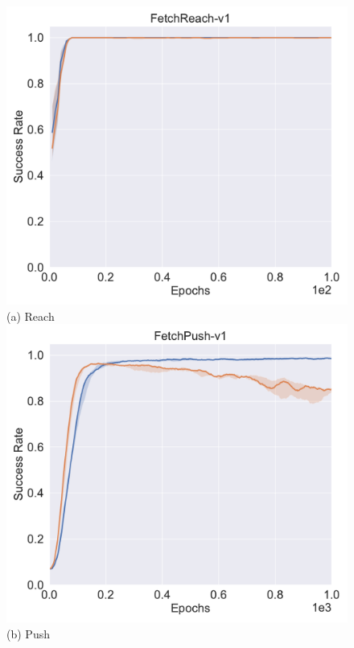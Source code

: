 \begin{figure}[h!]
\centering
{}
  \centering
  \includegraphics[width=\linewidth]{figures/chapter3/reach_hs.pdf}
  ({a}) Reach
\endminipage
{}%
  \centering
  \includegraphics[width=\linewidth]{figures/chapter3/push_hs.pdf}
  ({b}) Push
\endminipage\hfill
{}%
  \centering

\end{figure}
